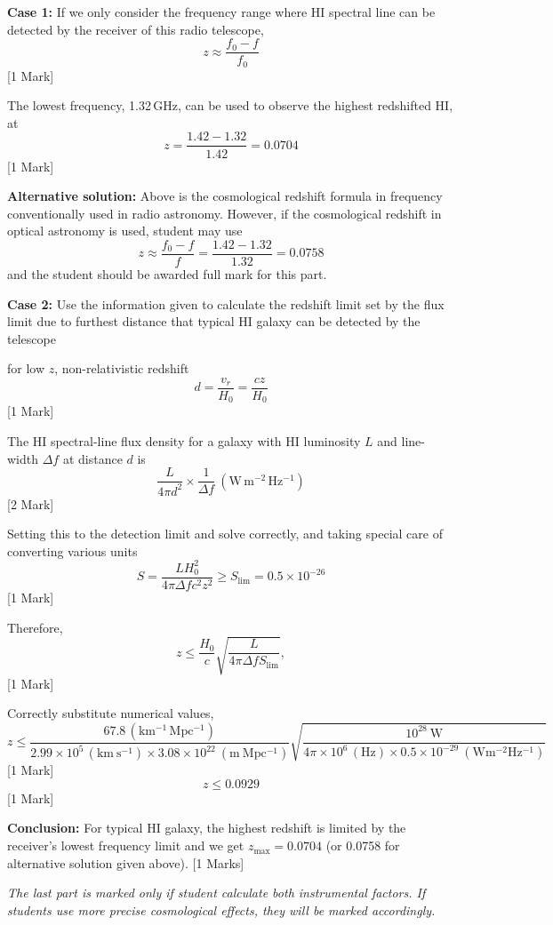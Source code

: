 \textbf{Case 1:} If we only consider the frequency range where HI spectral
line can be detected by the receiver of this radio telescope,
\[ z \approx \frac{f_0 - f}{f_0} \]
\hfill[1 Mark]

The lowest frequency, 1.32\,GHz, can be used to observe the highest
redshifted HI, at
\[ z = \frac{1.42 - 1.32}{1.42} = 0.0704 \]
\hfill[1 Mark]

\textbf{Alternative solution:} Above is the cosmological redshift formula in
frequency conventionally used in radio astronomy. However, if the
cosmological redshift in optical astronomy is used, student may use
\[ z \approx \frac{f_0 - f}{f} = \frac{1.42 - 1.32}{1.32} = 0.0758 \]
and the student should be awarded full mark for this part.

\textbf{Case 2:} Use the information given to calculate the redshift limit
set by the flux limit due to furthest distance that typical HI galaxy can be
detected by the telescope

for low $z$, non-relativistic redshift
\[ d = \frac{v_r}{H_0} = \frac{cz}{H_0} \]
\hfill[1 Mark]

The HI spectral-line flux density for a galaxy with HI luminosity $L$ and
line-width $\Delta f$ at distance $d$ is
\[ \frac{L}{4\pi d^2}\times\frac{1}{\Delta f}\
   (\mathrm{W\,m^{-2}\,Hz^{-1}}) \]
\hfill[2 Mark]

Setting this to the detection limit and solve correctly, and taking special
care of converting various units
\[ S = \frac{L H_0^2}{4\pi\Delta f c^2 z^2} \ge S_{\mathrm{lim}}
     = 0.5\times10^{-26} \]
\hfill[1 Mark]

Therefore,
\[ z \le \frac{H_0}{c}\sqrt{\frac{L}{4\pi\Delta f S_{\mathrm{lim}}}}, \]
\hfill[1 Mark]

Correctly substitute numerical values,
\[ z \le \frac{67.8\,(\mathrm{km^{-1}\,Mpc^{-1}})}
     {2.99\times10^{5}\,(\mathrm{km\ s^{-1}})\times
      3.08\times10^{22}\ (\mathrm{m\ Mpc^{-1}})}
   \sqrt{\frac{10^{28}\ \mathrm{W}}
     {4\pi\times10^{6}\,(\mathrm{Hz})\times0.5\times10^{-29}\
      (\mathrm{Wm^{-2}Hz^{-1}})}} \]
\hfill[1 Mark]
\[ z \le 0.0929 \]
\hfill[1 Mark]

\textbf{Conclusion:} For typical HI galaxy, the highest redshift is limited
by the receiver's lowest frequency limit and we get $z_{\max} = 0.0704$ (or
0.0758 for alternative solution given above). \hfill[1 Marks]

\emph{The last part is marked only if student calculate both instrumental
factors. If students use more precise cosmological effects, they will be
marked accordingly.}
